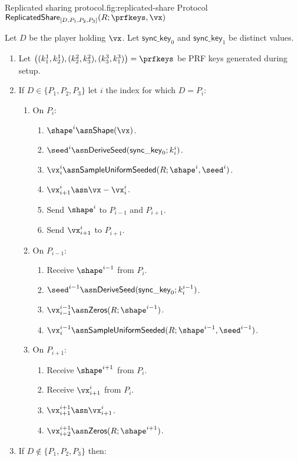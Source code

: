
\begin{Boxfig}{Replicated sharing protocol.}{fig:replicated-share}
  {Protocol $\mathsf{ReplicatedShare}_{[D, P_1, P_2, P_3]}(R; \prfkeys, \vx)$}

  Let $D$ be the player holding $\vx$. Let $\mathsf{sync\_key}_0$ and $\mathsf{sync\_key}_1$ be distinct values.

  \begin{enumerate}
  \item Let $\left( (k_1^1, k_2^1), (k_2^2, k_3^2), (k_3^3, k_1^3) \right) = \prfkeys$ be PRF keys generated during setup.
  \item If $D \in \{P_1, P_2, P_3\}$ let $i$ the index for which $D = P_i$:

    \begin{enumerate}
    \item On $P_i$:
      \begin{enumerate}
        \item $\shape^i \asn \mathsf{Shape}(\vx)$.
        \item ${\seed}^i \asn \mathsf{DeriveSeed}(\mathsf{sync\_key}_0; k^i_i)$.
        \item $\vx_i^i \asn \mathsf{SampleUniformSeeded}(R; \shape^i, \seed^i)$.
        \item $\vx_{i+1}^i \asn \vx - \vx_i^i$.
        \item Send $\shape^i$ to $P_{i-1}$ and $P_{i+1}$.
        \item Send $\vx_{i+1}^i$ to $P_{i+1}$.
      \end{enumerate}

    \item On $P_{i-1}$:
      \begin{enumerate}
        \item Receive $\shape^{i-1}$ from $P_i$.
        \item ${\seed}^{i-1} \asn \mathsf{DeriveSeed}(\mathsf{sync\_key}_0; k^{i-1}_i)$.
        \item $\vx_{i-1}^{i-1} \asn \mathsf{Zeros}(R; \shape^{i-1})$.
        \item $\vx_i^{i-1} \asn \mathsf{SampleUniformSeeded}(R; \shape^{i-1}, \seed^{i-1})$.
      \end{enumerate}

    \item On $P_{i+1}$:
      \begin{enumerate}
        \item Receive $\shape^{i+1}$ from $P_i$.
        \item Receive $\vx_{i+1}^i$ from $P_i$.
        \item $\vx_{i+1}^{i+1} \asn \vx_{i+1}^i$.
        \item $\vx_{i+2}^{i+1} \asn \mathsf{Zeros}(R; \shape^{i+1})$.
      \end{enumerate}
    \end{enumerate}
  \item If $D \notin \{P_1, P_2, P_3\}$ then:


\end{enumerate}
\end{Boxfig}
